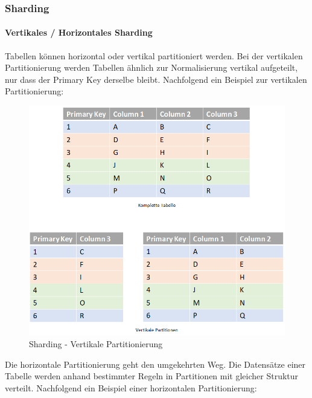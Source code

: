 
\begin{flushleft}
    \subsubsection{Sharding}
    \paragraph{Vertikales / Horizontales Sharding}
    Tabellen können horizontal oder vertikal partitioniert werden.
    Bei der vertikalen Partitionierung werden Tabellen ähnlich zur Normalisierung vertikal aufgeteilt, nur dass der Primary Key derselbe bleibt.
    Nachfolgend ein Beispiel zur vertikalen Partitionierung:
    \begin{figure}[H]
        \centering
        \includegraphics[width=0.8\linewidth]{source/implementation/evaluation/excursus_architecture/sharding_vertical_partitioning}
        \caption{Sharding - Vertikale Partitionierung}
        \label{fig:sharding_vertical_partitioning}
    \end{figure}
    Die horizontale Partitionierung geht den umgekehrten Weg.
    Die Datensätze einer Tabelle werden anhand bestimmter Regeln in Partitionen mit gleicher Struktur verteilt.
    Nachfolgend ein Beispiel einer horizontalen Partitionierung:
    \begin{figure}[H]
        \centering

\end{figure}
\end{flushleft}
